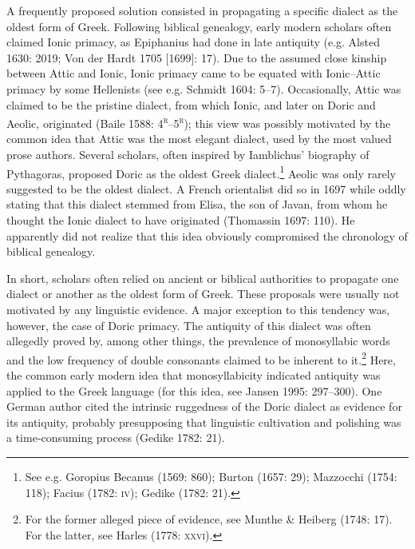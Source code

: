 \begin{styleStandard}
A frequently proposed solution consisted in propagating a specific dialect as the oldest form of Greek. Following biblical genealogy, early modern scholars often claimed Ionic primacy, as Epiphanius had done in late antiquity (e.g. Alsted 1630: 2019; Von der Hardt 1705 [1699]: 17). Due to the assumed close kinship between Attic and Ionic, Ionic primacy came to be equated with Ionic–Attic primacy by some Hellenists (see e.g. Schmidt 1604: 5–7). Occasionally, Attic was claimed to be the pristine dialect, from which Ionic, and later on Doric and Aeolic, originated (Baile 1588: 4\textsc{\textsuperscript{r}}–5\textsc{\textsuperscript{r}}); this view was possibly motivated by the common idea that Attic was the most elegant dialect, used by the most valued prose authors. Several scholars, often inspired by Iamblichus’ biography of Pythagoras, proposed Doric as the oldest Greek dialect.\footnote{ See e.g. Goropius Becanus (1569: 860); Burton (1657: 29); Mazzocchi (1754: 118); Facius (1782: \textsc{iv}); Gedike (1782: 21).} Aeolic was only rarely suggested to be the oldest dialect. A French orientalist did so in 1697 while oddly stating that this dialect stemmed from Elisa, the son of Javan, from whom he thought the Ionic dialect to have originated (Thomassin 1697: 110). He apparently did not realize that this idea obviously compromised the chronology of biblical genealogy.
\end{styleStandard}

\begin{styleStandard}
In short, scholars often relied on ancient or biblical authorities to propagate one dialect or another as the oldest form of Greek. These proposals were usually not motivated by any linguistic evidence. A major exception to this tendency was, however, the case of Doric primacy. The antiquity of this dialect was often allegedly proved by, among other things, the prevalence of monosyllabic words and the low frequency of double consonants claimed to be inherent to it.\footnote{ For the former alleged piece of evidence, see Munthe \& Heiberg (1748: 17). For the latter, see Harles (1778: \textsc{xxvi).}} Here, the common early modern idea that monosyllabicity indicated antiquity was applied to the Greek language (for this idea, see Jansen 1995: 297–300). One German author cited the intrinsic ruggedness of the Doric dialect as evidence for its antiquity, probably presupposing that linguistic cultivation and polishing was a time-consuming process (Gedike 1782: 21).
\end{styleStandard}

